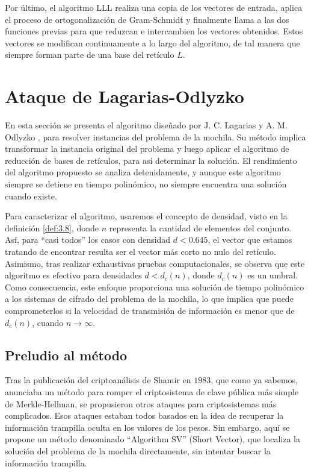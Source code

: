     Por último, el algoritmo LLL realiza una copia de los vectores de entrada, aplica el proceso de ortogonalización de Gram-Schmidt y finalmente llama a las dos funciones previas para que reduzcan e intercambien los vectores obtenidos. Estos vectores se modifican continuamente a lo largo del algoritmo, de tal manera que siempre forman parte de una base del retículo $L$.

    \newpage

    \section{Ataque de Lagarias-Odlyzko}

    En esta sección se presenta el algoritmo diseñado por J. C. Lagarias y A. M. Odlyzko \cite{artLagOdl}, para resolver instancias del problema de la mochila. Su método implica transformar la instancia original del problema y luego aplicar el algoritmo de reducción de bases de retículos, para así determinar la solución. El rendimiento del algoritmo propuesto se analiza detenidamente, y aunque este algoritmo siempre se detiene en tiempo polinómico, no siempre encuentra una solución cuando existe.

    Para caracterizar el algoritmo, usaremos el concepto de densidad, visto en la definición \ref{def:3.8}, donde $n$ representa la cantidad de elementos del conjunto. Así, para ``casi todos'' los casos con densidad $d < 0.645$, el vector que estamos tratando de encontrar resulta ser el vector más corto no nulo del retículo. Asimismo, tras realizar exhaustivas pruebas computacionales, se observa que este algoritmo es efectivo para densidades $d < d_{c}(n)$, donde $d_{c}(n)$ es un umbral. Como consecuencia, este enfoque proporciona una solución de tiempo polinómico a los sistemas de cifrado del problema de la mochila, lo que implica que puede comprometerlos si la velocidad de transmisión de información es menor que de $d_{c}(n)$, cuando $n \rightarrow \infty$.

    \subsection{Preludio al método}

    Tras la publicación del criptoanálisis de Shamir en $1983$, que como ya sabemos, anunciaba un método para romper el criptosistema de clave pública más simple de Merkle-Hellman, se propusieron otros ataques para criptosistemas más complicados. Esos ataques estaban todos basados en la idea de recuperar la información trampilla oculta en los valores de los pesos. Sin embargo, aquí se propone un método denominado ``Algorithm SV'' (Short Vector), que localiza la solución del problema de la mochila directamente, sin intentar buscar la información trampilla.

